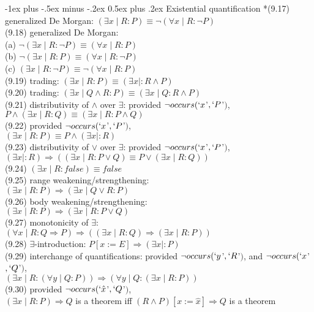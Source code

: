 \documentclass[10pt,landscape]{article}
\makeatletter
\renewcommand{\subsection}{\@startsection{subsection}{2}{0mm}%
                                {-1ex plus -.5ex minus -.2ex}%
                                {0.5ex plus .2ex}%
                                {\normalfont\small\bfseries}}
\makeatother
\begin{document}
\begin{multicols}{3}
{\subsection{Existential quantification}
*(9.17) generalized De Morgan: $(\exists x\mid R:P)\equiv \neg(\forall x\mid R:\neg P)$\\
(9.18) generalized De Morgan:\\
\qquad(a) $\neg(\exists x\mid R:\neg P)\equiv (\forall x\mid R:P)$\\
\qquad(b) $\neg(\exists x\mid R:P)\equiv (\forall x\mid R:\neg P)$\\
\qquad(c) $(\exists x\mid R:\neg P)\equiv \neg(\forall x\mid R:P)$\\
(9.19) trading: $(\exists x\mid R:P)\equiv (\exists x\mid:R\land P)$\\
(9.20) trading: $(\exists x\mid Q\land R:P)\equiv (\exists x\mid Q:R\land P)$\\
(9.21) distributivity of $\land$ over $\exists$: provided $\neg occurs(`x$'$,`P$'$)$,\\
\qquad$P\land (\exists x\mid R:Q)\equiv (\exists x\mid R:P\land Q)$\\
(9.22) provided $\neg occurs(`x$'$,`P$'$)$,\\
\qquad$(\exists x\mid R:P)\equiv P\land (\exists x\mid:R)$\\
(9.23) distributivity of $\lor$ over $\exists$: provided $\neg occurs(`x$'$,`P$'$)$,\\
\qquad$(\exists x\mid: R)\Rightarrow ((\exists x\mid R:P\lor Q)\equiv P\lor (\exists x\mid R:Q))$\\
(9.24) $(\exists x\mid R:false)\equiv false$\\
(9.25) range weakening/strengthening:\\
\qquad$(\exists x\mid R:P)\Rightarrow(\exists x\mid Q\lor R:P)$\\
(9.26) body weakening/strengthening:\\
\qquad$(\exists x\mid R:P)\Rightarrow(\exists x\mid R:P\lor Q)$\\
(9.27) monotonicity of $\exists$:\\
\qquad$(\forall x\mid R:Q\Rightarrow P)\Rightarrow((\exists x\mid R:Q) \Rightarrow(\exists x\mid R:P))$\\
(9.28) $\exists$-introduction: $P[x:=E]\Rightarrow (\exists x\mid:P)$\\
(9.29) interchange of quantifications: provided $\neg occurs(`y$'$,`R$'$)$, and $\neg occurs(`x$'$,`Q$'$)$,\\
\qquad$(\exists x\mid R:(\forall y\mid Q:P))\Rightarrow(\forall y\mid Q:(\exists x\mid R:P))$\\
(9.30) provided $\neg occurs(`\hat{x}$'$,`Q$'$)$,\\
\qquad $(\exists x\mid R:P)\Rightarrow Q$ is a theorem iff $(R\land P)[x:=\hat{x}]\Rightarrow Q$ is a theorem

}
\end{multicols}
\end{document}

